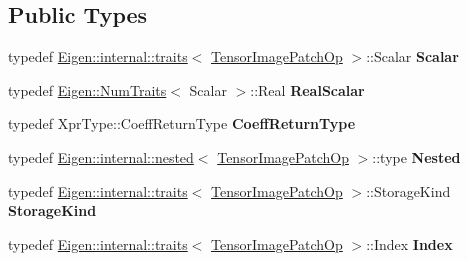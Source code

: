 \subsection*{Public Types}
\begin{DoxyCompactItemize}
\item 
\mbox{\label{class_eigen_1_1_tensor_image_patch_op_a629a2fb2626a469849c4172d62dc0a37}} 
typedef \hyperlink{struct_eigen_1_1internal_1_1traits}{Eigen\+::internal\+::traits}$<$ \hyperlink{class_eigen_1_1_tensor_image_patch_op}{Tensor\+Image\+Patch\+Op} $>$\+::Scalar {\bfseries Scalar}
\item 
\mbox{\label{class_eigen_1_1_tensor_image_patch_op_aec4a6f6784e9058ee6f5a528d3441738}} 
typedef \hyperlink{group___core___module_struct_eigen_1_1_num_traits}{Eigen\+::\+Num\+Traits}$<$ Scalar $>$\+::Real {\bfseries Real\+Scalar}
\item 
\mbox{\label{class_eigen_1_1_tensor_image_patch_op_a48983ec5100ddb0091415ca2ce981fb1}} 
typedef Xpr\+Type\+::\+Coeff\+Return\+Type {\bfseries Coeff\+Return\+Type}
\item 
\mbox{\label{class_eigen_1_1_tensor_image_patch_op_abf76ea110a22ffa6728540c0f8587341}} 
typedef \hyperlink{struct_eigen_1_1internal_1_1nested}{Eigen\+::internal\+::nested}$<$ \hyperlink{class_eigen_1_1_tensor_image_patch_op}{Tensor\+Image\+Patch\+Op} $>$\+::type {\bfseries Nested}
\item 
\mbox{\label{class_eigen_1_1_tensor_image_patch_op_ac5771a48f774f325857942bc9c41cd2c}} 
typedef \hyperlink{struct_eigen_1_1internal_1_1traits}{Eigen\+::internal\+::traits}$<$ \hyperlink{class_eigen_1_1_tensor_image_patch_op}{Tensor\+Image\+Patch\+Op} $>$\+::Storage\+Kind {\bfseries Storage\+Kind}
\item 
\mbox{\label{class_eigen_1_1_tensor_image_patch_op_ac44a00b97d4321e7a739c47fd7049f98}} 
typedef \hyperlink{struct_eigen_1_1internal_1_1traits}{Eigen\+::internal\+::traits}$<$ \hyperlink{class_eigen_1_1_tensor_image_patch_op}{Tensor\+Image\+Patch\+Op} $>$\+::Index {\bfseries Index}
\item 

\end{DoxyCompactItemize}
